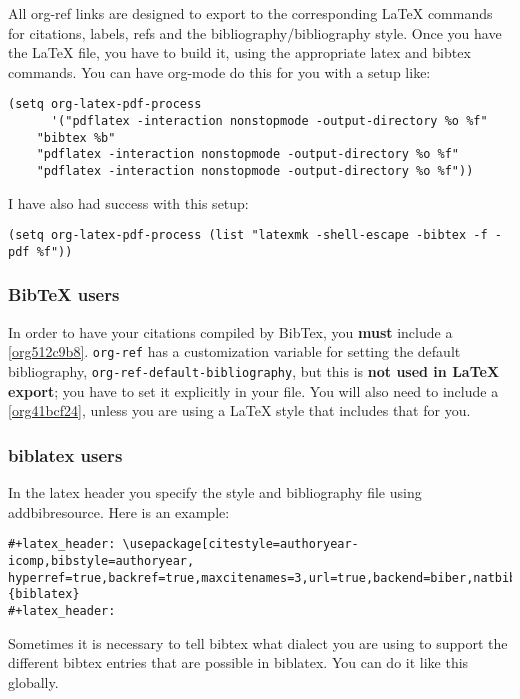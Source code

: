 \documentclass[11pt]{article}
\begin{document}
All org-ref links are designed to export to the corresponding \LaTeX{} commands for citations, labels, refs and the bibliography/bibliography style. Once you have the \LaTeX{} file, you have to build it, using the appropriate latex and bibtex commands. You can have org-mode do this for you with a setup like:

\begin{verbatim}
(setq org-latex-pdf-process
      '("pdflatex -interaction nonstopmode -output-directory %o %f"
	"bibtex %b"
	"pdflatex -interaction nonstopmode -output-directory %o %f"
	"pdflatex -interaction nonstopmode -output-directory %o %f"))
\end{verbatim}

I have also had success with this setup:

\begin{verbatim}
(setq org-latex-pdf-process (list "latexmk -shell-escape -bibtex -f -pdf %f"))
\end{verbatim}

\subsubsection{BibTeX users}
\label{sec:org18026ee}
In order to have your citations compiled by BibTex, you \textbf{must} include a \ref{org512c9b8}. \texttt{org-ref} has a customization variable for setting the default bibliography, \texttt{org-ref-default-bibliography}, but this is \textbf{not used in \LaTeX{} export}; you have to set it explicitly in your file. You will also need to include a \ref{org41bcf24}, unless you are using a \LaTeX{} style that includes that for you.

\subsubsection{biblatex users}
\label{sec:org8aed75f}
In the latex header you specify the style and bibliography file using addbibresource. Here is an example:

\begin{verbatim}
#+latex_header: \usepackage[citestyle=authoryear-icomp,bibstyle=authoryear, hyperref=true,backref=true,maxcitenames=3,url=true,backend=biber,natbib=true] {biblatex}
#+latex_header: 
\end{verbatim}

Sometimes it is necessary to tell bibtex what dialect you are using to support the different bibtex entries that are possible in biblatex. You can do it like this globally.
\end{document}
